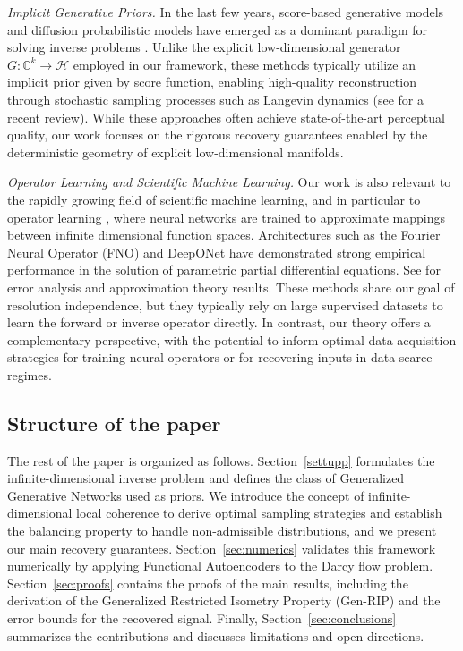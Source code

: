 \documentclass[a4paper,oneside]{amsart}
\begin{document}
\textit{Implicit Generative Priors.} In the last few years, score-based generative models and diffusion probabilistic models have emerged as a dominant paradigm for solving inverse problems \cite{song2021scorebased,chung2023diffusion}. Unlike the explicit low-dimensional generator $G: \mathbb{C}^k \to \mathcal{H}$ employed in our framework, these methods typically utilize an implicit prior given by score function, enabling high-quality reconstruction through stochastic sampling processes such as Langevin dynamics (see \cite{daras2024survey} for a recent review). While these approaches often achieve state-of-the-art perceptual quality, our work focuses on the rigorous recovery guarantees enabled by the deterministic geometry of explicit low-dimensional manifolds.

\textit{Operator Learning and Scientific Machine Learning.}
Our work is also relevant to the rapidly growing field of scientific machine learning, and in particular to operator learning \cite{boulle2024mathematical}, where neural networks are trained to approximate mappings between infinite dimensional function spaces. Architectures such as the Fourier Neural Operator (FNO) \cite{darcy-dataset} and DeepONet \cite{lu2021learning} have demonstrated strong empirical performance in the solution of parametric partial differential equations. See \cite{lanthaler2022error,kovachki2023neural} for error analysis and approximation theory results. These methods share our goal of resolution independence, but they typically rely on large supervised datasets to learn the forward or inverse operator directly. In contrast, our theory offers a complementary perspective, with the potential to inform optimal data acquisition strategies for training neural operators or for recovering inputs in data-scarce regimes.

\subsection{Structure of the paper}
The rest of the paper is organized as follows. Section~\ref{settupp} formulates the infinite-dimensional inverse problem and defines the class of Generalized Generative Networks used as priors. We introduce the concept of infinite-dimensional local coherence to derive optimal sampling strategies and establish the balancing property to handle non-admissible distributions, and we present our main recovery guarantees. Section~\ref{sec:numerics} validates this framework numerically by applying Functional Autoencoders \cite{bunker2025autoencoders} to the Darcy flow problem. Section~\ref{sec:proofs} contains the proofs of the main results, including the derivation of the Generalized Restricted Isometry Property (Gen-RIP) and the error bounds for the recovered signal. Finally, Section~\ref{sec:conclusions} summarizes the contributions and discusses limitations and open directions.
\end{document}
